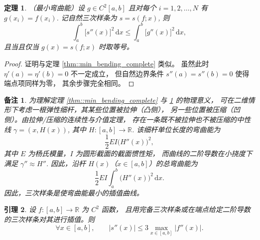\documentclass[a4paper]{ctexart}
\newtheorem{theorem}{定理}
\newtheorem{remark}{备注}
\newtheorem{lemma}[theorem]{引理}
\numberwithin{theorem}{section}
\numberwithin{equation}{section}
\numberwithin{figure}{section}
\numberwithin{remark}{section}
\begin{document}
\begin{theorem}
    \label{thm::min_bending_natural}
（最小弯曲能）设 $g\in C^{2}[a,b]$ 且对每个 
$i=1,2,\ldots,N$ 有 $g(x_i)=f(x_i)$. 记自然三次样条为 $s=s(f;x)$, 则
\begin{equation}
    \label{eq::min_energy_natural}
\int_{a}^{b}\bigl[s''(x)\bigr]^2\,\mathrm{d}x
\le
\int_{a}^{b}\bigl[g''(x)\bigr]^2\,\mathrm{d}x,
\end{equation}
且当且仅当 $g(x)=s(f;x)$ 时取等号。
\end{theorem}

\begin{proof}
证明与定理 \ref{thm::min_bending_complete} 类似。
虽然此时 $\eta'(a)=\eta'(b)=0$ 不一定成立，
但自然边界条件 $s''(a)=s''(b)=0$ 使得端点项同样为零，
其余步骤完全相同。
\end{proof}

\begin{remark}
    \label{rem::physical_meaning_min_energy}
为理解定理 \ref{thm::min_bending_complete} 
与 \ref{thm::min_bending_natural} 的物理意义，
可在二维情形下考虑一根弹性细杆，其某些位置被拉伸（凸侧），
另一些位置被压缩（凹侧）。由拉伸/压缩的连续性与介值定理，
存在一条既不被拉伸也不被压缩的中性线 $\gamma=(x,H(x))$, 
其中 $H:[a,b]\to\mathbb{R}$. 该细杆单位长度的弯曲能为
\[
\frac{1}{2}EI\bigl(H''(x)\bigr)^2,
\]
其中 $E$ 为杨氏模量，$I$ 为圆形截面的截面惯性矩，
而曲线的二阶导数在小挠度下满足 $\gamma''\approx H''$. 
因此，沿杆 $H(x)$（$x\in[a,b]$）的总弯曲能为
\[
\frac{1}{2}EI\int_{a}^{b}\bigl(H''(x)\bigr)^2\,\mathrm{d}x.
\]
因此，三次样条是使弯曲能最小的插值曲线。
\end{remark}

\begin{lemma}
    \label{lem::spp_bound_second_derivative}
设 $f:[a,b]\to\mathbb{R}$ 为 $C^{2}$ 函数，
且用完备三次样条或在端点给定二阶导数的三次样条对其进行插值。则
\begin{equation}
    \label{eq::s_bound_second_derivative}
\forall x\in[a,b],\qquad |s''(x)|\le 3\max_{x\in[a,b]}|f''(x)|.
\end{equation}
\end{lemma}
\end{document}
